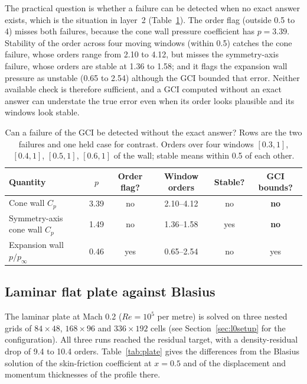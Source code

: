 \documentclass[11pt,a4paper]{article}
\newcommand{\Cp}{C_p}
\newcommand{\pinf}{p_\infty}
\newcommand{\tick}{yes}
\newcommand{\cross}{\textbf{no}}
\begin{document}
The practical question is whether a failure can be detected when no exact answer exists, which is the situation
in layer~2 (Table~\ref{tab:detect}).
The order flag (outside 0.5 to 4) misses both failures, because the cone wall pressure coefficient has $p=3.39$.
Stability of the order across four moving windows (within 0.5) catches the cone failure, whose orders range from
2.10 to 4.12, but misses the symmetry-axis failure, whose orders are stable at 1.36 to 1.58;
and it flags the expansion wall pressure as unstable (0.65 to 2.54) although the GCI bounded that error.
Neither available check is therefore sufficient, and a GCI computed without an exact answer can understate the
true error even when its order looks plausible and its windows look stable.

\begin{table}[t]
\centering
\caption{Can a failure of the GCI be detected without the exact answer? Rows are the two failures and one held case for contrast. Orders over four windows $[0.3,1]$, $[0.4,1]$, $[0.5,1]$, $[0.6,1]$ of the wall; stable means within 0.5 of each other.}
\label{tab:detect}
\small
\begin{tabular}{@{}lccccc@{}}
\toprule
Quantity & $p$ & Order flag? & Window orders & Stable? & GCI bounds? \\
\midrule
Cone wall $\Cp$ & 3.39 & no & 2.10--4.12 & no & \cross \\
Symmetry-axis cone wall $\Cp$ & 1.49 & no & 1.36--1.58 & yes & \cross \\
Expansion wall $p/\pinf$ & 0.46 & yes & 0.65--2.54 & no & \tick \\
\bottomrule
\end{tabular}
\end{table}

\subsection{Laminar flat plate against Blasius}
\label{sec:plate}

The laminar plate at Mach 0.2 ($Re=10^5$ per metre) is solved on three nested grids of $84\times48$, $168\times96$
and $336\times192$ cells (see Section~\ref{sec:l0setup} for the configuration).
All three runs reached the residual target, with a density-residual drop of 9.4 to 10.4 orders.
Table~\ref{tab:plate} gives the differences from the Blasius solution of the skin-friction coefficient at $x=0.5$
and of the displacement and momentum thicknesses of the profile there.
\end{document}
